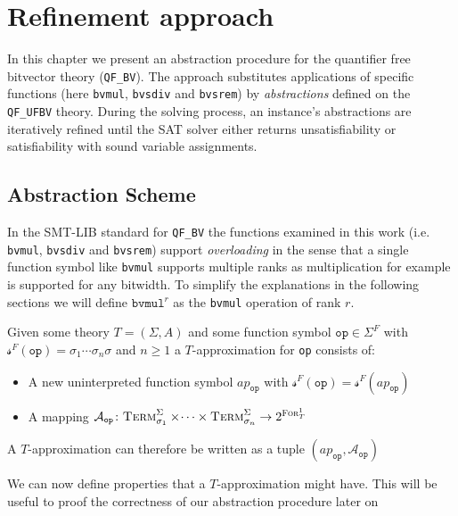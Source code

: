 \chapter{Refinement approach}
In this chapter we present an abstraction procedure for the quantifier free bitvector theory (\texttt{QF\_BV}).
The approach substitutes applications of specific functions (here \texttt{bvmul}, \texttt{bvsdiv} and \texttt{bvsrem}) by \textit{abstractions} defined on the \texttt{QF\_UFBV} theory.
During the solving process, an instance's abstractions are iteratively refined until the SAT solver either returns unsatisfiability or satisfiability with sound variable assignments.

\section{Abstraction Scheme}
In the SMT-LIB standard \cite{BarFT-SMTLIB} for \texttt{QF\_BV} the functions examined in this work (i.e. \texttt{bvmul}, \texttt{bvsdiv} and \texttt{bvsrem}) support \textit{overloading} in the sense that a single function symbol like \texttt{bvmul} supports multiple ranks as multiplication for example is supported for any bitwidth.
To simplify the explanations in the following sections we will define $\texttt{bvmul}^r$ as the \texttt{bvmul} operation of rank $r$.

\begin{definition}[Approximation]
Given some theory $T=\left(\Sigma,A\right)$ and some function symbol $\texttt{op}\in\Sigma^F$ with $\mathcal{s}^F\left(\texttt{op}\right)=\sigma_1\dotsi\sigma_n\sigma$ and $n\geq1$ a $T$-approximation for \texttt{op} consists of:
\begin{itemize}
    \item A new uninterpreted function symbol $ap_{\texttt{op}}$ with $\mathcal{s}^F\left(\texttt{op}\right) = \mathcal{s}^F\left(ap_{\texttt{op}}\right)$
    \item A mapping $\mathcal{A}_{\texttt{op}}\colon \textsc{Term}^\Sigma_{\sigma_1}\times\dotsi\times\textsc{Term}^\Sigma_{\sigma_n} \to 2^{\textsc{For}^1_T}$
\end{itemize}
A $T$-approximation can therefore be written as a tuple $\left(ap_{\texttt{op}}, \mathcal{A}_{\texttt{op}}\right)$
\end{definition}
We can now define properties that a $T$-approximation might have. This will be useful to proof the correctness of our abstraction procedure later on

